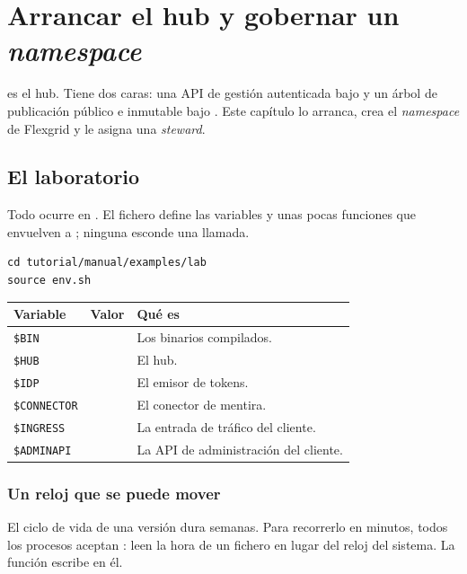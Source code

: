 \chapter{Arrancar el hub y gobernar un \emph{namespace}}
\label{ch:hub}

 es el hub. Tiene dos caras: una API de gestión autenticada bajo  y un árbol de
publicación público e inmutable bajo . Este capítulo lo arranca, crea el \emph{namespace} de Flexgrid
y le asigna una \emph{steward}.

\section{El laboratorio}

Todo ocurre en . El fichero  define las variables y unas pocas
funciones que envuelven a ; ninguna esconde una llamada.

\begin{lstlisting}[style=sh]
cd tutorial/manual/examples/lab
source env.sh
\end{lstlisting}

\noindent\begin{tabularx}{\linewidth}{@{}L{3.3cm}L{5.1cm}Y@{}}
\toprule
\textbf{Variable} & \textbf{Valor} & \textbf{Qué es} \\
\midrule
\texttt{\$BIN} &  & Los binarios compilados. \\
\texttt{\$HUB} &  & El hub. \\
\texttt{\$IDP} &  & El emisor de tokens. \\
\texttt{\$CONNECTOR} &  & El conector de mentira. \\
\texttt{\$INGRESS} &  & La entrada de tráfico del cliente. \\
\texttt{\$ADMINAPI} &  & La API de administración del cliente. \\
\bottomrule
\end{tabularx}

\subsection{Un reloj que se puede mover}

El ciclo de vida de una versión dura semanas. Para recorrerlo en minutos, todos los procesos aceptan
: leen la hora de un fichero en lugar del reloj del sistema. La función  escribe en
él.

